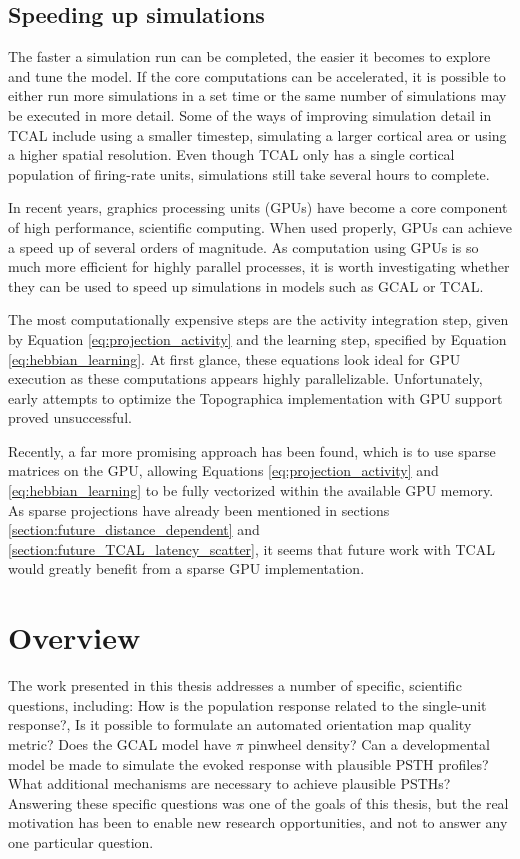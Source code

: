 \documentclass[phd,ianc,twoside]{infthesis}
\begin{document}
\subsection{Speeding up simulations}

The faster a simulation run can be completed, the easier it becomes to
explore and tune the model. If the core computations can be accelerated,
it is possible to either run more simulations in a set time or the same
number of simulations may be executed in more detail. Some of the ways of
improving simulation detail in TCAL include using a smaller timestep,
simulating a larger cortical area or using a higher spatial
resolution. Even though TCAL only has a single cortical population of
firing-rate units, simulations still take several hours to complete.

In recent years, graphics processing units (GPUs) have become a core
component of high performance, scientific computing. When used properly,
GPUs can achieve a speed up of several orders of magnitude. As
computation using GPUs is so much more efficient for highly parallel
processes, it is worth investigating whether they can be used to speed
up simulations in models such as GCAL or TCAL.

The most computationally expensive steps are the activity integration
step, given by Equation \ref{eq:projection_activity} and the learning
step, specified by Equation \ref{eq:hebbian_learning}. At first glance,
these equations look ideal for GPU execution as these computations
appears highly parallelizable. Unfortunately, early attempts to optimize
the Topographica implementation with GPU support proved unsuccessful.

Recently, a far more promising approach has been found, which is to use
sparse matrices on the GPU, allowing Equations
\ref{eq:projection_activity} and \ref{eq:hebbian_learning} to be fully
vectorized within the available GPU memory. As sparse projections have
already been mentioned in sections
\ref{section:future_distance_dependent} and
\ref{section:future_TCAL_latency_scatter}, it seems that future work with
TCAL would greatly benefit from a sparse GPU implementation.

\section{Overview}

The work presented in this thesis addresses a number of specific,
scientific questions, including: How is the population response related
to the single-unit response?, Is it possible to formulate an automated
orientation map quality metric? Does the GCAL model have $\pi$ pinwheel
density? Can a developmental model be made to simulate the evoked response
with plausible PSTH profiles? What additional mechanisms are necessary
to achieve plausible PSTHs?  Answering these specific questions was
one of the goals of this thesis, but the real motivation has been to
enable new research opportunities, and not to answer any one particular
question.
\end{document}
